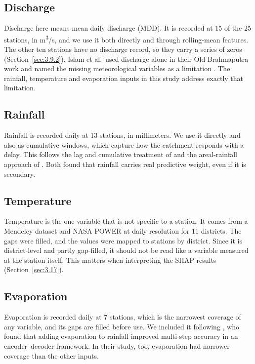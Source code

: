 

\subsection{Discharge}
\label{sec:3.8.2}

Discharge here means mean daily discharge (MDD). It is recorded at 15 of the 25
stations, in m\textsuperscript{3}/s, and we use it both directly and through
rolling-mean features. The other ten stations have no discharge record, so they
carry a series of zeros (Section~\ref{sec:3.9.2}). Islam et al.\ used discharge
alone in their Old Brahmaputra work and named the missing meteorological
variables as a limitation \cite{Islam2026a}. The rainfall, temperature and
evaporation inputs in this study address exactly that limitation.

\subsection{Rainfall}
\label{sec:3.8.3}

Rainfall is recorded daily at 13 stations, in millimeters. We use it directly and
also as cumulative windows, which capture how the catchment responds with a
delay. This follows the lag and cumulative treatment of \cite{Islam2026b} and the
areal-rainfall approach of \cite{Cui2022}. Both found that rainfall carries real
predictive weight, even if it is secondary.

\subsection{Temperature}
\label{sec:3.8.4}

Temperature is the one variable that is not specific to a station. It comes from
a Mendeley dataset and NASA POWER at daily resolution for 11 districts. The gaps
were filled, and the values were mapped to stations by district. Since it is
district-level and partly gap-filled, it should not be read like a variable
measured at the station itself. This matters when interpreting the SHAP results
(Section~\ref{sec:3.17}).

\subsection{Evaporation}
\label{sec:3.8.5}

Evaporation is recorded daily at 7 stations, which is the narrowest coverage of
any variable, and its gaps are filled before use. We included it following
\cite{Cui2022}, who found that adding evaporation to rainfall improved
multi-step accuracy in an encoder--decoder framework. In their study, too,
evaporation had narrower coverage than the other inputs.


